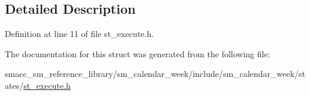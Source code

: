 \subsection{Detailed Description}


Definition at line 11 of file st\+\_\+execute.\+h.



The documentation for this struct was generated from the following file\+:\begin{DoxyCompactItemize}
\item 
smacc\+\_\+sm\+\_\+reference\+\_\+library/sm\+\_\+calendar\+\_\+week/include/sm\+\_\+calendar\+\_\+week/states/\hyperlink{sm__calendar__week_2include_2sm__calendar__week_2states_2st__execute_8h}{st\+\_\+execute.\+h}\end{DoxyCompactItemize}
